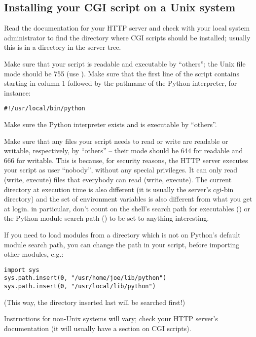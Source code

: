 \subsection{Installing your CGI script on a Unix system}

Read the documentation for your HTTP server and check with your local
system administrator to find the directory where CGI scripts should be
installed; usually this is in a directory  in the server tree.

Make sure that your script is readable and executable by ``others''; the
Unix file mode should be 755 (use ).  Make sure
that the first line of the script contains \code{\#!} starting in column 1
followed by the pathname of the Python interpreter, for instance:

\bcode\begin{verbatim}
#!/usr/local/bin/python
\end{verbatim}\ecode
%
Make sure the Python interpreter exists and is executable by ``others''.

Make sure that any files your script needs to read or write are
readable or writable, respectively, by ``others'' -- their mode should
be 644 for readable and 666 for writable.  This is because, for
security reasons, the HTTP server executes your script as user
``nobody'', without any special privileges.  It can only read (write,
execute) files that everybody can read (write, execute).  The current
directory at execution time is also different (it is usually the
server's cgi-bin directory) and the set of environment variables is
also different from what you get at login.  in particular, don't count
on the shell's search path for executables () or the Python
module search path () to be set to anything interesting.

If you need to load modules from a directory which is not on Python's
default module search path, you can change the path in your script,
before importing other modules, e.g.:

\bcode\begin{verbatim}
import sys
sys.path.insert(0, "/usr/home/joe/lib/python")
sys.path.insert(0, "/usr/local/lib/python")
\end{verbatim}\ecode
%
(This way, the directory inserted last will be searched first!)

Instructions for non-Unix systems will vary; check your HTTP server's
documentation (it will usually have a section on CGI scripts).


